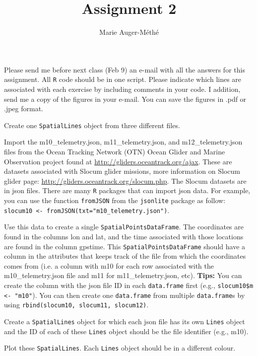 \documentclass[11pt, oneside]{article}   	%
\title{Assignment 2}
\author{Marie Auger-M\'eth\'e}
\date{}							%
\begin{document}
\maketitle

Please send me before next class (Feb 9) an e-mail with all the answers for this assignment. All \texttt{R} code should be in one script. Please indicate which lines are associated with each exercise by including comments in your code. I addition, send me a copy of the figures in your e-mail. You can save the figures in .pdf or .jpeg format.

\begin{Exercise}

Create one \texttt{SpatialLines} object from three different files.

\Question
Import the m10\_telemetry.json, m11\_telemetry.json, and m12\_telemetry.json files from the Ocean Tracking Network (OTN) Ocean Glider and Marine Observation project found at \url{http://gliders.oceantrack.org/ajax}. These are datasets associated with Slocum glider missions, more information on Slocum glider page: \url{http://gliders.oceantrack.org/slocum.php}. The Slocum datasets are in json files. There are many \texttt{R} packages that can import json data. For example, you can use the function \texttt{fromJSON} from the \texttt{jsonlite} package as follow: \texttt{slocum10 <- fromJSON(txt="m10\_telemetry.json")}.

\Question Use this data to create a single \texttt{SpatialPointsDataFrame}. The coordinates are found in the columns lon and lat, and the time associated with those locations are found in the column gpstime. This \texttt{SpatialPointsDataFrame} should have a column in the attributes that keeps track of the file from which the coordinates comes from (i.e. a column with m10 for each row associated with the m10\_telemetry.json file and m11 for m11\_telemetry.json, etc). \textbf{Tips:} You can create the column with the json file ID in each \texttt{data.frame} first (e.g., \texttt{slocum10\$m <- "m10"}). You can then create one \texttt{data.frame} from multiple \texttt{data.frame}s by using \texttt{rbind(slocum10, slocum11, slocum12)}. 

\Question Create a \texttt{SpatialLines} object for which each json file has its own \texttt{Lines} object and the ID of each of these \texttt{Lines} object should be the file identifier (e.g., m10). 

\Question Plot these \texttt{SpatialLines}. Each \texttt{Lines} object  should be in a different colour.

\end{Exercise}
\end{document}

